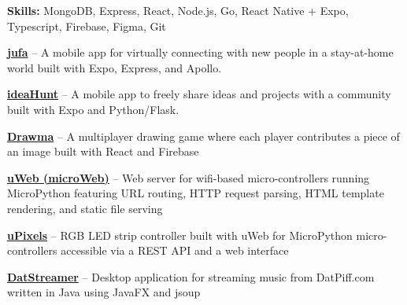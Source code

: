 \smallskip
\textbf{Skills:} MongoDB, Express, React, Node.js, Go, React Native + Expo, Typescript, Firebase, Figma, Git






\textbf{\href{https://github.com/youngppl/connect}{jufa}} -- A mobile app for virtually connecting with new people in a stay-at-home world built with Expo, Express, and Apollo.

\smdivider

\textbf{\href{https://github.com/drizzleco/ideahunt}{ideaHunt}} -- A mobile app to freely share ideas and projects with a community built with Expo and Python/Flask.

\smdivider

\textbf{\href{https://github.com/drizzleco/PuzzlePieces}{Drawma}} -- A multiplayer drawing game where each player contributes a piece of an image built with React and Firebase

\smdivider

\textbf{\href{https://github.com/petabite/uWeb}{uWeb (microWeb)}} -- Web server for wifi-based micro-controllers running MicroPython featuring URL routing, HTTP request parsing, HTML template rendering, and static file serving

\smdivider

\textbf{\href{https://github.com/petabite/uPixels}{uPixels}} -- RGB LED strip controller built with uWeb for
MicroPython micro-controllers accessible via a REST API and a web interface

\smdivider

\textbf{\href{https://github.com/petabite/DatStreamer}{DatStreamer}} -- Desktop application for streaming music from DatPiff.com written in Java using JavaFX and jsoup

